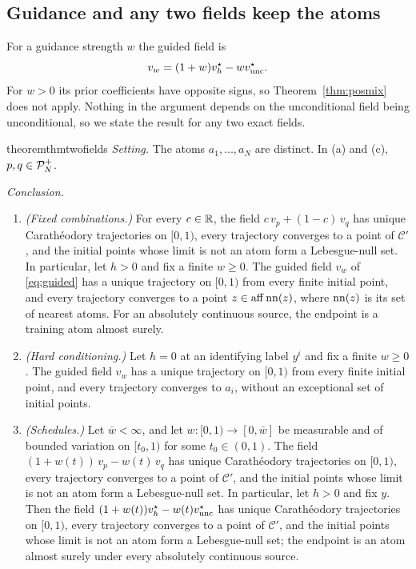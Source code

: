 \documentclass{article} %
\theoremstyle{plain}
\theoremstyle{definition}
\theoremstyle{remark}
\begin{document}
\subsection{Guidance and any two fields keep the atoms}
\label{sec:guidance}

For a guidance strength $w$ the guided field is
\begin{equation}
v_w=(1+w)v_h^\star-wv_{\mathrm{unc}}^\star .
\label{eq:guided}
\end{equation}
For $w>0$ its prior coefficients have opposite signs, so Theorem~\ref{thm:posmix} does not apply.
Nothing in the argument depends on the unconditional field being unconditional, so we state the
result for any two exact fields.

\begin{restatable}{theorem}{thmtwofields}
\label{thm:twofields}
\emph{Setting.} The atoms $a_1,\dots,a_N$ are distinct. In (a) and (c), $p,q\in\mathcal{P}_N^{+}$.

\emph{Conclusion.}
\begin{enumerate}[label=(\alph*),leftmargin=2em]
\item \emph{(Fixed combinations.)} For every $c\in\mathbb{R}$, the field $c\,v_p+(1-c)\,v_q$ has unique
  Carath\'eodory trajectories on $[0,1)$, every trajectory converges to a point of $\mathcal C'$,
  and the initial points whose limit is not an atom form a Lebesgue-null set.
  In particular, let $h>0$ and fix a finite $w\ge0$. The guided field $v_w$ of
  \eqref{eq:guided} has a unique trajectory on $[0,1)$ from every finite initial point, and every
  trajectory converges to a point $z\in\operatorname{aff}\operatorname{nn}(z)$, where $\operatorname{nn}(z)$ is its set of
  nearest atoms. For an absolutely continuous source, the endpoint is a training atom almost
  surely.
\item \emph{(Hard conditioning.)} Let $h=0$ at an identifying label $y^i$ and fix a finite
  $w\ge0$. The guided field $v_w$ has a unique trajectory on $[0,1)$ from every finite initial
  point, and every trajectory converges to $a_i$, without an exceptional set of initial points.
\item \emph{(Schedules.)} Let $\bar w<\infty$, and let $w:[0,1)\to[0,\bar w]$ be measurable and
  of bounded variation on $[t_0,1)$ for some $t_0\in(0,1)$. The field
  $(1+w(t))\,v_p-w(t)\,v_q$ has unique Carath\'eodory trajectories on $[0,1)$, every trajectory
  converges to a point of $\mathcal C'$, and the initial points whose limit is not an atom form a
  Lebesgue-null set.
  In particular, let $h>0$ and fix $y$. Then the field
  $(1+w(t))v_h^\star-w(t)v_{\mathrm{unc}}^\star$ has unique Carath\'eodory trajectories on $[0,1)$,
  every trajectory converges to a point of $\mathcal C'$, and the initial points whose limit is
  not an atom form a Lebesgue-null set; the endpoint is an atom almost surely under every
  absolutely continuous source.
\end{enumerate}
\end{restatable}
\end{document}
